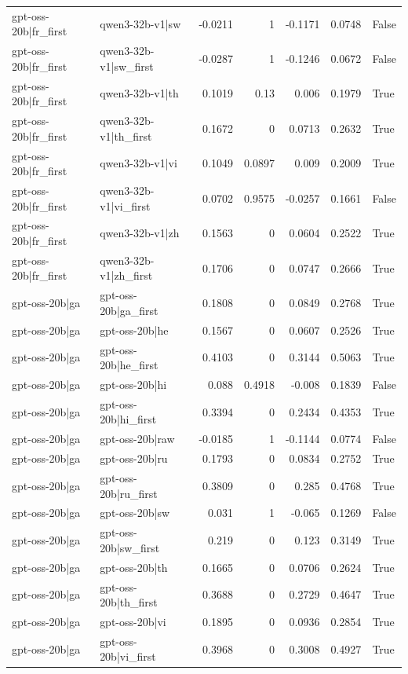 \begin{table}
\begin{tabular}{l l r r r r l}
gpt-oss-20b|fr_first & qwen3-32b-v1|sw & -0.0211 & 1 & -0.1171 & 0.0748 & False \\
gpt-oss-20b|fr_first & qwen3-32b-v1|sw_first & -0.0287 & 1 & -0.1246 & 0.0672 & False \\
gpt-oss-20b|fr_first & qwen3-32b-v1|th & 0.1019 & 0.13 & 0.006 & 0.1979 & True \\
gpt-oss-20b|fr_first & qwen3-32b-v1|th_first & 0.1672 & 0 & 0.0713 & 0.2632 & True \\
gpt-oss-20b|fr_first & qwen3-32b-v1|vi & 0.1049 & 0.0897 & 0.009 & 0.2009 & True \\
gpt-oss-20b|fr_first & qwen3-32b-v1|vi_first & 0.0702 & 0.9575 & -0.0257 & 0.1661 & False \\
gpt-oss-20b|fr_first & qwen3-32b-v1|zh & 0.1563 & 0 & 0.0604 & 0.2522 & True \\
gpt-oss-20b|fr_first & qwen3-32b-v1|zh_first & 0.1706 & 0 & 0.0747 & 0.2666 & True \\
gpt-oss-20b|ga & gpt-oss-20b|ga_first & 0.1808 & 0 & 0.0849 & 0.2768 & True \\
gpt-oss-20b|ga & gpt-oss-20b|he & 0.1567 & 0 & 0.0607 & 0.2526 & True \\
gpt-oss-20b|ga & gpt-oss-20b|he_first & 0.4103 & 0 & 0.3144 & 0.5063 & True \\
gpt-oss-20b|ga & gpt-oss-20b|hi & 0.088 & 0.4918 & -0.008 & 0.1839 & False \\
gpt-oss-20b|ga & gpt-oss-20b|hi_first & 0.3394 & 0 & 0.2434 & 0.4353 & True \\
gpt-oss-20b|ga & gpt-oss-20b|raw & -0.0185 & 1 & -0.1144 & 0.0774 & False \\
gpt-oss-20b|ga & gpt-oss-20b|ru & 0.1793 & 0 & 0.0834 & 0.2752 & True \\
gpt-oss-20b|ga & gpt-oss-20b|ru_first & 0.3809 & 0 & 0.285 & 0.4768 & True \\
gpt-oss-20b|ga & gpt-oss-20b|sw & 0.031 & 1 & -0.065 & 0.1269 & False \\
gpt-oss-20b|ga & gpt-oss-20b|sw_first & 0.219 & 0 & 0.123 & 0.3149 & True \\
gpt-oss-20b|ga & gpt-oss-20b|th & 0.1665 & 0 & 0.0706 & 0.2624 & True \\
gpt-oss-20b|ga & gpt-oss-20b|th_first & 0.3688 & 0 & 0.2729 & 0.4647 & True \\
gpt-oss-20b|ga & gpt-oss-20b|vi & 0.1895 & 0 & 0.0936 & 0.2854 & True \\
gpt-oss-20b|ga & gpt-oss-20b|vi_first & 0.3968 & 0 & 0.3008 & 0.4927 & True \\

\end{tabular}
\end{table}
